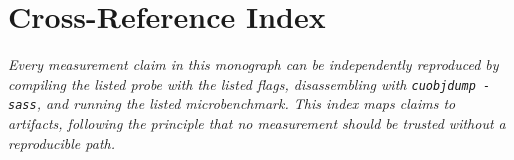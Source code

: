 %

\section{Cross-Reference Index}
\label{sec:crossref}

\noindent\textit{%
Every measurement claim in this monograph can be independently reproduced
by compiling the listed probe with the listed flags, disassembling with
\texttt{cuobjdump -sass}, and running the listed microbenchmark.  This
index maps claims to artifacts, following the principle that no measurement
should be trusted without a reproducible path.}

\bigskip

